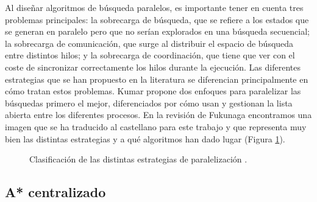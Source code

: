 \documentclass[a4paper,12pt]{article}
\begin{document}
Al diseñar algoritmos de búsqueda paralelos, es importante tener en cuenta tres problemas principales: la sobrecarga de búsqueda, que se refiere a los estados que se generan en paralelo pero que no serían explorados en una búsqueda secuencial; la sobrecarga de comunicación, que surge al distribuir el espacio de búsqueda entre distintos hilos; y la sobrecarga de coordinación, que tiene que ver con el coste de sincronizar correctamente los hilos durante la ejecución. Las diferentes estrategias que se han propuesto en la literatura se diferencian principalmente en cómo tratan estos problemas. Kumar \cite{kumar1988parallel} propone dos enfoques para paralelizar las búsquedas primero el mejor, diferenciados por cómo usan y gestionan la lista abierta entre los diferentes procesos. En la revisión de Fukunaga \cite{fukunaga2017survey} encontramos una imagen que se ha traducido al castellano para este trabajo y que representa muy bien las distintas estrategias y a qué algoritmos han dado lugar (Figura \ref{fig:clasficiacion}).

\begin{figure}[H]
    \centering
    
    \caption{Clasificación de las distintas estrategias de paralelización \cite{fukunaga2017survey}.}
    \label{fig:clasficiacion}
\end{figure}


\subsection{A* centralizado} \label{sec:centralizado}
\end{document}
